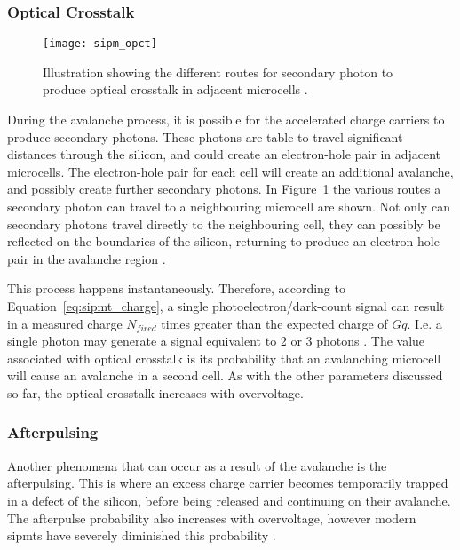 \subsubsection{Optical Crosstalk}

\begin{figure}
	\centering
    \texttt{[image: sipm\_opct]} 
	\caption[Illustration of the possible ways optical crosstalk is produced.]{Illustration showing the different routes for secondary photon to produce optical crosstalk in adjacent microcells \cite{Rech2008}.}
	\label{fig:sipm_opct}
\end{figure}

During the avalanche process, it is possible for the accelerated charge carriers to produce secondary photons. These photons are table to travel significant distances through the silicon, and could create an electron-hole pair in adjacent microcells. The electron-hole pair for each cell will create an additional avalanche, and possibly create further secondary photons. In Figure~\ref{fig:sipm_opct} the various routes a secondary photon can travel to a neighbouring microcell are shown. Not only can secondary photons travel directly to the neighbouring cell, they can possibly be reflected on the boundaries of the silicon, returning to produce an electron-hole pair in the avalanche region \cite{Rech2008}.

This process happens instantaneously. Therefore, according to Equation~\ref{eq:sipmt_charge}, a single photoelectron/dark-count signal can result in a measured charge $N_{fired}$ times greater than the expected charge of $G q$. I.e. a single photon may generate a signal equivalent to 2 or 3 photons \cite{SensL2011}. The value associated with optical crosstalk is its probability that an avalanching microcell will cause an avalanche in a second cell. As with the other parameters discussed so far, the optical crosstalk increases with overvoltage.

\subsubsection{Afterpulsing}

Another phenomena that can occur as a result of the avalanche is the afterpulsing. This is where an excess charge carrier becomes temporarily trapped in a defect of the silicon, before being released and continuing on their avalanche. The afterpulse probability also increases with overvoltage, however modern \glspl{sipmt} have severely diminished this probability \cite{Ghassemi2017,SensL2011}.

